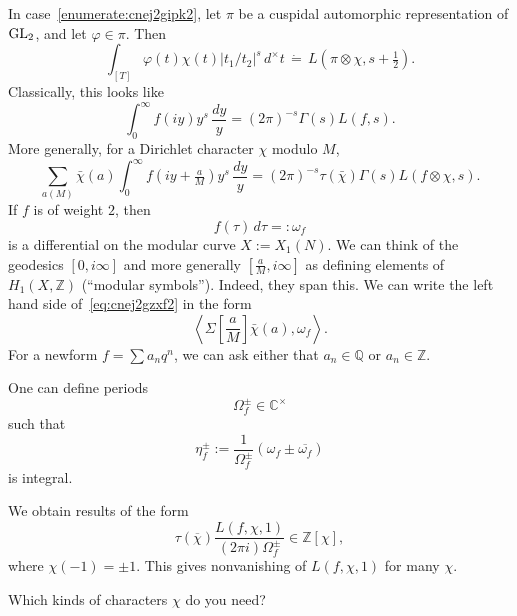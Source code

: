 \documentclass[reqno]{amsart} 
\begin{document}
In case~\eqref{enumerate:cnej2gipk2}, let $\pi$ be a cuspidal automorphic representation of $\operatorname{GL}_2$, and let $\varphi \in \pi$.  Then
\begin{equation*}
  \int_{[T]} \varphi(t) \chi(t) \lvert t_1 / t_2 \rvert^s \, d^\times t
  \, \dot{=}\,
  L(\pi \otimes \chi, s + \tfrac{1}{2}).
\end{equation*}
Classically, this looks like
\begin{equation*}
  \int_0^\infty f(i y ) y^s \, \frac{d y}{y}
  ={(2 \pi)}^{- s} \Gamma(s) L(f, s).
\end{equation*}
More generally, for a Dirichlet character $\chi$ modulo $M$,
\begin{equation}\label{eq:cnej2gzxf2}
  \sum_{a (M)} \bar{\chi}(a) \int_0^\infty f(i y + \tfrac{a}{M} ) y^s \, \frac{d y}{y}
  =(2 \pi )^{- s} \tau(\bar{\chi})\Gamma(s) L(f \otimes \chi, s).
\end{equation}
If $f$ is of weight $2$, then
\begin{equation*}
  f(\tau) \, d \tau =: \omega_f 
\end{equation*}
is a differential on the modular curve $X := X_1(N)$.  We can think of the geodesics $[0,i \infty]$ and more generally $[ \tfrac{a}{M}, i \infty ]$ as defining elements of $H_1(X, \mathbb{Z})$ (``modular symbols'').  Indeed, they span this.  We can write the left hand side of~\eqref{eq:cnej2gzxf2} in the form
\begin{equation*}
  \left\langle \Sigma \left[ \frac{a}{M} \right]  \bar{\chi}(a), \omega_f \right\rangle.
\end{equation*}
For a newform $f= \sum a_n q^n$, we can ask either that $a_n \in \mathbb{Q}$ or $a_n \in \mathbb{Z}$.

One can define periods
\begin{equation*}
  \Omega_f^{\pm} \in \mathbb{C}^\times
\end{equation*}
such that
\begin{equation*}
  \eta_f^{\pm} := \frac{1}{ \Omega_f^{\pm} } \left( \omega_f \pm \overline{\omega_f} \right)
\end{equation*}
is integral.

We obtain results of the form
\begin{equation*}
  \tau(\overline{\chi})
  \frac{L(f, \chi, 1)}{(2 \pi i) \Omega_f^{\pm}}  \in \mathbb{Z} [\chi],
\end{equation*}
where $\chi(-1) = \pm 1$.  This gives nonvanishing of $L(f, \chi, 1)$ for many $\chi$.
\begin{question}\label{question:cnfg5jzthz}
  Which kinds of characters $\chi$ do you need?
\end{question}
\end{document}
